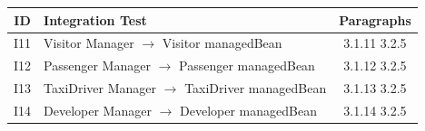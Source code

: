 \begin{table}[!htbp]
\begin{center}
\begin{tabular}[t]{c|p{}|c}

\textbf{ID} & \textbf{Integration Test} & \textbf{Paragraphs} \\
\hline
I11 & Visitor Manager $\rightarrow$ Visitor managedBean & 3.1.11  3.2.5 \\
\hline
I12 & Passenger Manager $\rightarrow$ Passenger managedBean & 3.1.12  3.2.5 \\
\hline
I13 & TaxiDriver Manager $\rightarrow$ TaxiDriver managedBean & 3.1.13  3.2.5 \\
\hline
I14 & Developer Manager $\rightarrow$ Developer managedBean & 3.1.14  3.2.5 \\
\hline

\end{tabular}
\end{center}
\end{table}
\clearpage